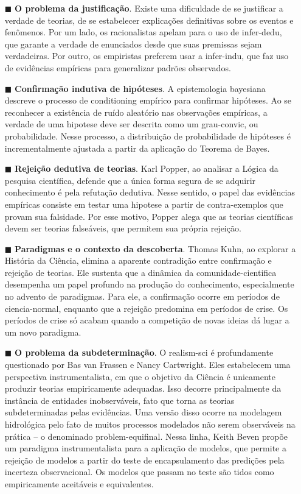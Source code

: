 \documentclass[./main.tex]{subfiles}
\begin{document}
\begin{itemize}
    \item[$\blacksquare$] \textbf{O problema da justificação}. Existe uma dificuldade de se justificar a verdade de teorias, de se estabelecer explicações definitivas sobre os eventos e fenômenos. Por um lado, os racionalistas apelam para o uso de \gls{infer-dedu}, que garante a verdade de enunciados desde que suas premissas sejam verdadeiras. Por outro, os empiristas preferem usar a \gls{infer-indu}, que faz uso de evidências empíricas para generalizar padrões observados.
    \item  [$\blacksquare$] \textbf{Confirmação indutiva de hipóteses}. A epistemologia bayesiana descreve o processo de \gls{conditioning} empírico para confirmar hipóteses. Ao se reconhecer a existência de ruído aleatório nas observações empíricas, a verdade de uma \gls{hipotese} deve ser descrita como um \gls{grau-convic}, ou probabilidade. Nesse processo, a distribuição de probabilidade de hipóteses é incrementalmente ajustada a partir da aplicação do Teorema de Bayes. 
    \item[$\blacksquare$] \textbf{Rejeição dedutiva de teorias}. Karl Popper, ao analisar a Lógica da pesquisa científica, defende que a única forma segura de se adquirir conhecimento é pela refutação dedutiva. Nesse sentido, o papel das evidências empíricas consiste em testar uma \gls{hipotese} a partir de contra-exemplos que provam sua falsidade. Por esse motivo, Popper alega que as teorias científicas devem ser teorias falseáveis, que permitem sua própria rejeição.  
    \item[$\blacksquare$] \textbf{Paradigmas e o contexto da descoberta}. Thomas Kuhn, ao explorar a História da Ciência, elimina a aparente contradição entre confirmação e rejeição de teorias. Ele sustenta que a dinâmica da \gls{comunidade-cientifica} desempenha um papel profundo na produção do conhecimento, especialmente no advento de paradigmas. Para ele, a confirmação ocorre em períodos de \gls{ciencia-normal}, enquanto que a rejeição predomina em períodos de crise. Os períodos de crise só acabam quando a competição de novas ideias dá lugar a um novo \gls{paradigma}.
    \item[$\blacksquare$] \textbf{O problema da subdeterminação}. O \gls{realism-sci} é profundamente questionado por Bas van Frassen e Nancy Cartwright. Eles estabelecem uma perspectiva instrumentalista, em que o objetivo da Ciência é unicamente produzir teorias empiricamente adequadas. Isso decorre principalmente da instância de entidades inobserváveis, fato que torna as teorias subdeterminadas pelas evidências. Uma versão disso ocorre na modelagem hidrológica pelo fato de muitos processos modelados não serem observáveis na prática -- o denominado \gls{problem-equifinal}. Nessa linha, Keith Beven propõe um \gls{paradigma} instrumentalista para a aplicação de modelos, que permite a rejeição de modelos a partir do teste de encapsulamento das predições pela incerteza observacional. Os modelos que passam no teste são tidos como empiricamente aceitáveis e equivalentes.  
\end{itemize}
\end{document}
